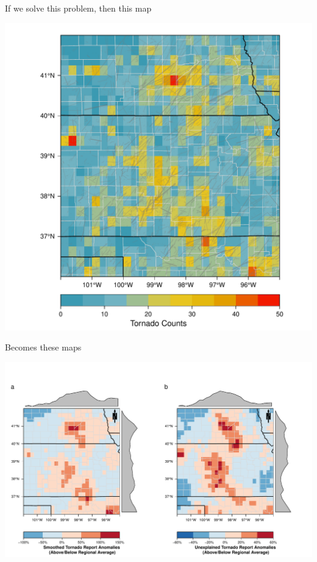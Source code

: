 \documentclass[handout]{beamer}
\begin{document}
\begin{frame}{If we solve this problem, then this map}
\begin{center}
\includegraphics[scale=.41]{figures/PathsGrids.pdf}
\end{center}
\end{frame}

\begin{frame}{Becomes these maps}
\vspace{-1cm}
\begin{center}
\includegraphics[scale=.42]{figures/TornadoReports.pdf}
\end{center}
\end{frame}
\end{document}
